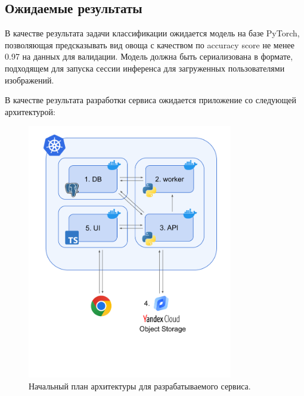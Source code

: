 \documentclass[a4paper,12pt]{extarticle}
\begin{document}
\subsection{Ожидаемые результаты}

В качестве результата задачи классификации ожидается модель на базе PyTorch, позволяющая
предсказывать вид овоща с качеством по accuracy score не менее 0.97 на данных для валидации. Модель
должна быть сериализована в формате, подходящем для запуска сессии инференса для загруженных
пользователями изображений.\par

В качестве результата разработки сервиса ожидается приложение со следующей архитектурой:

\begin{figure}[ht]
	\centering
	\includegraphics[width=0.8\textwidth,trim={0 2cm 0 0}]{expected_arch.png}
	\caption{Начальный план архитектуры для разрабатываемого сервиса.}
	\label{fig:expected_arch}
\end{figure}
\end{document}
